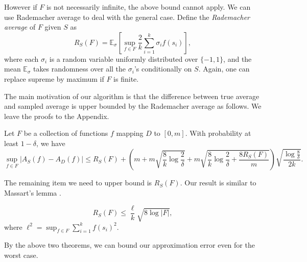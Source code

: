 \documentclass{article}
\begin{document}
However if $F$ is not necessarily infinite, the above bound cannot apply. We can use Rademacher average to deal with the general case. 
Define the \emph{Rademacher average} \cite{Mohri09,BM02,Oneto13} of $F$ given $S$ as
\newcommand{\E}{\mathbb{E}}
$$R_S(F) = \E_\sigma \left[\sup_{f\in F} \frac{2}{k}\sum_{i=1}^k \sigma_i f(s_i) \right],$$
where each $\sigma_i$ is a random variable uniformly distributed over $\{-1, 1\}$, and the mean $\E_\sigma$ takes randomness over all the $\sigma_i$'s conditionally on $S$. Again, one can replace supreme by maximum if $F$ is finite.

The main motivation of our algorithm is that the difference between true average and sampled average is upper bounded by the Rademacher average as follows.
We leave the proofs to the Appendix.

\begin{theorem}
\label{thm:main}
Let $F$ be a collection of functions $f$ mapping $D$ to $[0,m]$. 
With probability at least $1-\delta$, we have
$$\sup_{f\in F}|A_S(f) - A_D(f)| \leq R_S(F) + \left(m+m\sqrt{\frac{8}{k}\log \frac{2}{\delta}} + m\sqrt{\frac{8}{k}\log \frac{2}{\delta} + \frac{8R_S(F)}{m}}\right)\sqrt{\frac{\log \frac{8}{\delta}}{2k}}.$$
\end{theorem}

The remaining item we need to upper bound is $R_S(F)$. Our result is similar to Massart's lemma \cite{AGO14}.

\begin{theorem}
\label{thm2}
$$R_S(F) \leq \frac{\ell}{k}\sqrt{8\log |F|},$$
where $\ell^2 = \sup_{f\in F}\sum_{i=1}^k f(s_i)^2$.
\end{theorem}

By the above two theorems, we can bound our approximation error even for the worst case.
\end{document}
